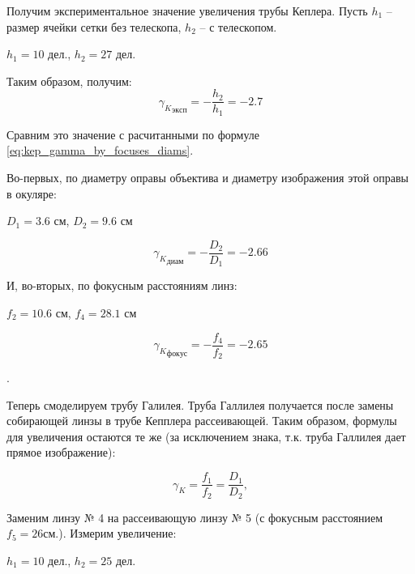 \documentclass[a4paper, 12pt]{article}
\newcounter{Points}
\newcommand{\point}{\arabic{Points}. \addtocounter{Points}{1}}
\begin{document}
Получим экспериментальное значение увеличения трубы Кеплера. Пусть $h_1$ -- размер ячейки сетки без телескопа, $h_2$ -- с телескопом. 

\begin{center}
    $h_1 = 10$ дел., \hspace{1cm} $h_2 = 27$ дел.
\end{center}

Таким образом, получим:
\begin{equation*}
    {\gamma_{K}}_{эксп} = -\frac{h_2}{h_1} = -2.7
\end{equation*}

Сравним это значение с расчитанными по формуле \eqref{eq:kep_gamma_by_focuses_diams}.

Во-первых, по диаметру оправы объектива и диаметру изображения этой оправы в окуляре:
\begin{center}
	$D_1 = 3.6 $ см, \hspace{1cm} $D_2 = 9.6 $ см
\end{center}

\begin{equation*}
    {\gamma_{K}}_{диам} = -\frac{D_2}{D_1} = -2.66
\end{equation*}

И, во-вторых, по фокусным расстояниям линз:
\begin{center}
	$f_2 = 10.6$ см, \hspace{1cm} $f_4 = 28.1$ см
\end{center}

\begin{equation*}
    {\gamma_{K}}_{фокус} = -\frac{f_4}{f_2} = -2.65
\end{equation*}

\point Теперь смоделируем трубу Галилея. Труба Галлилея получается после замены собирающей линзы в трубе Кепплера рассеивающей. Таким образом, формулы для увеличения остаются те же (за исключением знака, т.к. труба Галлилея дает прямое изображение):

\begin{equation}
    \label{eq:gal_gamma_by_focuses_diams}
    \gamma_K = \frac{f_1}{f_2} = \frac{D_1}{D_2},
\end{equation}

Заменим линзу № 4 на рассеивающую линзу № 5 (с фокусным расстоянием $f_5 = 26 см.$). Измерим увеличение:

\begin{center}
    $h_1 = 10 $ дел., \hspace{1cm} $h_2 = 25 $ дел. \par
\end{center}
\end{document}
